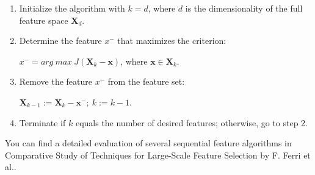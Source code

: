 \documentclass[11pt]{article}
\begin{document}
    \begin{enumerate}
        \item Initialize the algorithm with $k=d$, where $d$ is the dimensionality of the full feature space $\boldsymbol{X}_d$.
        \item Determine the feature $x^-$ that maximizes the criterion:

        $x^-=arg~max~J(\boldsymbol{X}_k - \boldsymbol{x})$, where $\boldsymbol{x}\in \boldsymbol{X}_k$.

        \item Remove the feature $x^-$ from the feature set:

        $\boldsymbol{X}_{k-1}:=\boldsymbol{X}_k - \boldsymbol{x}^-;~k:=k-1$.

        \item Terminate if $k$ equals the number of desired features;
        otherwise, go to step 2.
    \end{enumerate}

    You can find a detailed evaluation of several sequential feature algorithms in Comparative Study of Techniques for Large-Scale Feature Selection by F. Ferri et al.\cite{Ferri1994}.

    
    
\end{document}
